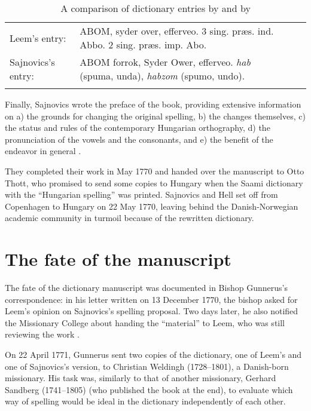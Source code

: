 \documentclass[output=paper,colorlinks,citecolor=brown,arabicfont,chinesefont]{langscibook}
\begin{document}
\begin{table}
\caption {A comparison of dictionary entries by \textcite[44]{Sajnovics1994} and by \textcite[7]{Leem1768}}
\label{tab:kelemen:frequencies}
\begin{tabularx}{\linewidth}{*{2}{lQ}}
\lsptoprule
Leem’s entry: & ABOM, syder over, efferveo. 3 sing. præs. ind. Abbo. 2 sing. præs. imp. Abo. \\
Sajnovics’s entry: & ABOM forrok, Syder Ower, efferveo. \emph{hab} (spuma, unda), \emph{habzom} (spumo, undo). \\
\lspbottomrule
\end{tabularx}
\end{table}

Finally, Sajnovics wrote the preface of the book, providing extensive information on a) the grounds for changing the original spelling, b) the changes themselves, c) the status and rules of the contemporary Hungarian orthography, d) the pronunciation of the vowels and the consonants, and e) the benefit of the endeavor in general \citet[44]{Sajnovics1994}.

They completed their work in May 1770  and handed over the manuscript to Otto Thott, who promised to send some copies to Hungary when the Saami dictionary with the “Hungarian spelling” was printed. Sajnovics and Hell set off from Copenhagen to Hungary on 22 May 1770,  leaving behind the Danish-Norwegian academic community in turmoil because of the rewritten dictionary.

\section{The fate of the manuscript}

The fate of the dictionary manuscript was documented in Bishop Gunnerus’s correspondence: in his letter written on 13 December 1770,  the bishop asked for Leem’s opinion on Sajnovics’s spelling proposal. Two days later, he also notified the Missionary College about handing the “material” to Leem, who was still reviewing the work \citep[49--50]{Dahl1906}.

On 22 April 1771, Gunnerus sent two copies of the dictionary, one of Leem’s and one of Sajnovics’s version, to Christian Weldingh (1728–1801), a Danish-born missionary. His task was, similarly to that of another missionary, Gerhard Sandberg (1741--1805) (who published the book at the end), to evaluate which way of spelling would be ideal in the dictionary independently of each other.
\end{document}
